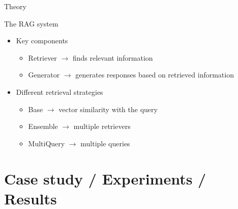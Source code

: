 \documentclass[handout]{beamer}\mode<handout>{\usetheme{AMSBolognaFC}}
\begin{document}
\begin{frame}{Theory}

    \begin{block}{The RAG system}
        \vfill
        \begin{itemize}
            \item Key components
            \begin{itemize}
                \item \alert{Retriever} $\rightarrow$ finds relevant information
                \item \alert{Generator} $\rightarrow$ generates responses based on retrieved information
            \end{itemize}
            \item Different retrieval strategies
            \begin{itemize}
                \item Base $\rightarrow$ vector similarity with the query
                \item Ensemble $\rightarrow$ multiple retrievers
                \item MultiQuery $\rightarrow$ multiple queries
            \end{itemize}
        \end{itemize}
        \vfill
    \end{block}
\end{frame}


\section{Case study / Experiments / Results}
\end{document}
